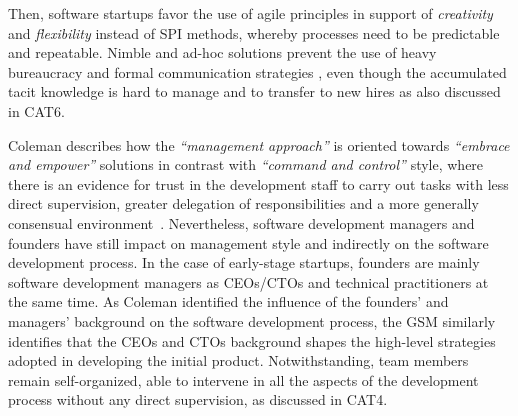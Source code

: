 \documentclass[10pt,journal,letterpaper,compsoc]{IEEEtran}
\begin{document}
Then, software startups favor the use of agile principles in support of
\textit{creativity} and \textit{flexibility} instead of SPI methods, whereby
processes need to be predictable and repeatable. Nimble and ad-hoc solutions
prevent the use of heavy bureaucracy and formal communication strategies %
, even though the accumulated tacit knowledge is hard to manage and to transfer 
to new hires as also discussed in CAT6.

Coleman describes how the \textit{``management approach''} is oriented towards
\textit{``embrace and empower''} solutions in contrast with \textit{``command
and control''} style, where there is an evidence for trust in the development
staff to carry out tasks with less direct supervision, greater delegation of
responsibilities and a more generally consensual environment~\cite{Coleman2008}.
Nevertheless, software development managers and founders have still impact on
management style and indirectly on the software development process. In the case
of early-stage startups, founders are mainly software development managers as
CEOs/CTOs and technical practitioners at the same time. As Coleman identified
the influence of the founders' and managers' background on the software
development process, the GSM similarly identifies that the CEOs and CTOs
background shapes the high-level strategies adopted in developing the initial
product. Notwithstanding, team members remain self-organized, able to intervene
in all the aspects of the development process without any direct supervision, as
discussed in CAT4.
\end{document}
